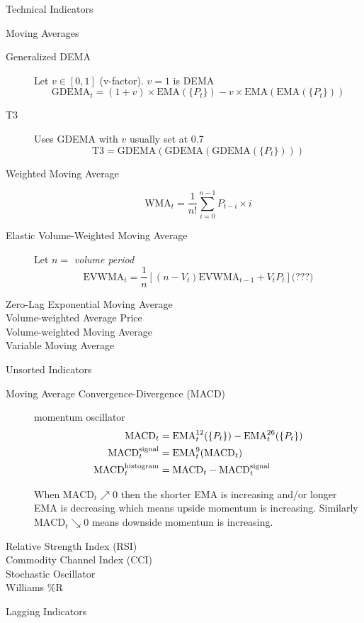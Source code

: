\documentclass{article}
\begin{document}
\begin{section}{Technical Indicators}
\begin{subsection}{Moving Averages}
\begin{description}
\item[Generalized DEMA] Let $v \in [0, 1]$ (v-factor). $v = 1$ is DEMA
 \[ \text{GDEMA}_t = (1 + v) \times \text{EMA}(\{P_t\}) - 
         v \times \text{EMA}(\text{EMA}(\{P_t\})) \]

\item[T3] Uses GDEMA with $v$ usually set at 0.7
 \[ \text{T3} = \text{GDEMA}(\text{GDEMA}(\text{GDEMA}(\{P_t\}))) \]

\item [Weighted Moving Average] 
 \[ \text{WMA}_t = \frac{1}{n!} \sum_{i=0}^{n-1} P_{t-i} \times i \]

\item[Elastic Volume-Weighted Moving Average] Let $n =$ \textit{volume period}
 \[ \text{EVWMA}_t = \frac{1}{n} [(n - V_t) \text{EVWMA}_{t-1} + V_t P_t] 
   \text{(???)}\]

\item[Zero-Lag Exponential Moving Average] 

\item[Volume-weighted Average Price]

\item[Volume-weighted Moving Average]

\item[Variable Moving Average]

\end{description}
\end{subsection}

\begin{subsection}{Unsorted Indicators}


\begin{description}
\item[Moving Average Convergence-Divergence (MACD)] momentum oscillator
  \begin{align}
  \text{MACD}_t &= \text{EMA}^{12}_t(\{P_t\}) - \text{EMA}^{26}_t(\{P_t\}) \notag\\
  \text{MACD}^{\text{signal}}_t &= \text{EMA}^9_t(\text{MACD}_t)\notag\\
  \text{MACD}^{\text{histogram}}_t &= \text{MACD}_t - \text{MACD}^{\text{signal}}_t \notag
  \end{align}

\noindent When $\text{MACD}_t \nearrow 0$ then the shorter EMA is increasing
and/or longer EMA is decreasing which means upside momentum is increasing.
Similarly $\text{MACD}_t \searrow 0$ means downside momentum is increasing.

\item[Relative Strength Index (RSI)] 
\item[Commodity Channel Index (CCI)]
\item[Stochastic Oscillator]
\item[Williams \%R]
\end{description}
\end{subsection}

\begin{subsection}{Lagging Indicators}

\end{subsection}
\end{section}
\end{document}
